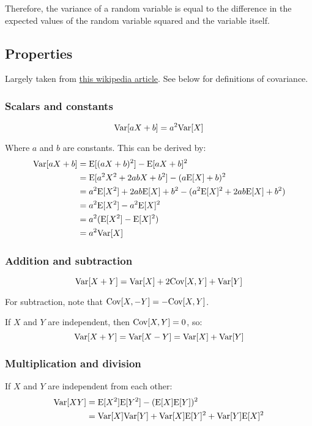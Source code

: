 \documentclass[12pt]{article}
\begin{document}
Therefore, the variance of a random variable is equal to the difference in the expected values of the random variable squared and the variable itself.

\subsection{Properties}

Largely taken from \href{https://en.wikipedia.org/wiki/Algebra_of_random_variables}{this wikipedia article}. See below for definitions of covariance.

\subsubsection{Scalars and constants}
$$ \mathrm{Var}[aX + b] = a^2 \mathrm{Var}[X] $$
    
Where $a$ and $b$ are constants.
This can be derived by:
\begin{align*}
    \mathrm{Var}[aX + b] &= \mathrm{E}[(aX + b)^2] - \mathrm{E}[aX + b]^2 \\
    &= \mathrm{E}[a^2 X^2 + 2ab X + b^2] - (a \mathrm{E}[X] + b)^2 \\
    &= a^2 \mathrm{E}[X^2] + 2ab \mathrm{E}[X] + b^2 - (a^2 \mathrm{E}[X]^2 + 2ab \mathrm{E}[X] + b^2) \\
    &= a^2 \mathrm{E}[X^2] - a^2 \mathrm{E}[X]^2 \\
    &= a^2 (\mathrm{E}[X^2] - \mathrm{E}[X]^2) \\
    &= a^2 \mathrm{Var}[X]
\end{align*}

\subsubsection{Addition and subtraction}
$$ \mathrm{Var}[X + Y] = \mathrm{Var}[X] + 2 \mathrm{Cov}[X,Y] + \mathrm{Var}[Y] $$

For subtraction, note that $\mathrm{Cov}[X,-Y] = - \mathrm{Cov}[X,Y]$.

If $X$ and $Y$ are independent, then $\mathrm{Cov}[X,Y]=0$, so:
$$ \mathrm{Var}[X + Y] = \mathrm{Var}[X - Y] = \mathrm{Var}[X] + \mathrm{Var}[Y] $$

\subsubsection{Multiplication and division}
If $X$ and $Y$ are independent from each other:
\begin{align*}
    \mathrm{Var}[X Y] &= \mathrm{E}[X^2] \mathrm{E}[Y^2] - (\mathrm{E}[X] \mathrm{E}[Y])^2 \\
    &= \mathrm{Var}[X] \mathrm{Var}[Y] + \mathrm{Var}[X] \mathrm{E}[Y]^2 + \mathrm{Var}[Y] \mathrm{E}[X]^2
\end{align*}
\end{document}
